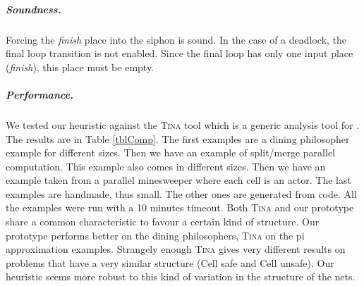 \documentclass[a4paper]{report}
\numberwithin{algorithm}{chapter}
\begin{document}
\subparagraph{Soundness.}
Forcing the \emph{finish} place into the siphon is sound.
In the case of a deadlock, the final loop transition is not enabled.
Since the final loop has only one input place (\emph{finish}), this place must be empty.

\subparagraph{Performance.}
We tested our heuristic against the \textsc{Tina} tool \cite{DBLP:conf/qest/BerthomieuV06} which is a generic analysis tool for \pns{}.
The results are in Table \ref{tblComp}.
The first examples are a dining philosopher example for different sizes.
Then we have an example of split/merge parallel computation.
This example also comes in different sizes.
Then we have an example taken from a parallel minesweeper where each cell is an actor.
The last examples are handmade, thus small.
The other ones are generated from \scala{} code.
All the examples were run with a 10 minutes timeout.
Both \textsc{Tina} and our prototype share a common characteristic to favour a certain kind of structure.
Our prototype performs better on the dining philosophers, \textsc{Tina} on the pi approximation examples.
Strangely enough \textsc{Tina} gives very different results on problems that have a very similar structure (Cell safe and Cell unsafe).
Our heuristic seems more robust to this kind of variation in the structure of the nets.
\end{document}

